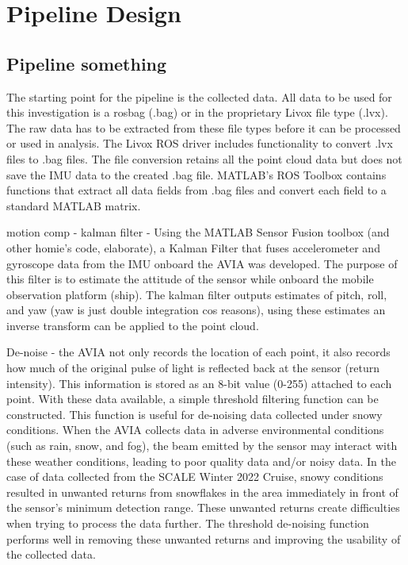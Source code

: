 \chapter{Pipeline Design}
\label{ch:ch5}
\section{Pipeline something}
\label{sec:ch5.section1}

The starting point for the pipeline is the collected data. All data to be used for this investigation is a rosbag (.bag) or in the proprietary Livox file type (.lvx). The raw data has to be extracted from these file types before it can be processed or used in analysis. The Livox ROS driver includes functionality to convert .lvx files to .bag files. The file conversion retains all the point cloud data but does not save the IMU data to the created .bag file. MATLAB's ROS Toolbox contains functions that extract all data fields from .bag files and convert each field to a standard MATLAB matrix.

motion comp - kalman filter - Using the MATLAB Sensor Fusion toolbox (and other homie's code, elaborate), a Kalman Filter that fuses accelerometer and gyroscope data from the IMU onboard the AVIA was developed. The purpose of this filter is to estimate the attitude of the sensor while onboard the mobile observation platform (ship). The kalman filter outputs estimates of pitch, roll, and yaw (yaw is just double integration cos reasons), using these estimates an inverse transform can be applied to the point cloud.

De-noise - the AVIA not only records the location of each point, it also records how much of the original pulse of light is reflected back at the sensor (return intensity). This information is stored as an 8-bit value (0-255) attached to each point. With these data available, a simple threshold filtering function can be constructed. This function is useful for de-noising data collected under snowy conditions. When the AVIA collects data in adverse environmental conditions (such as rain, snow, and fog), the beam emitted by the sensor may interact with these weather conditions, leading to poor quality data and/or noisy data. In the case of data collected from the SCALE Winter 2022 Cruise, snowy conditions resulted in unwanted returns from snowflakes in the area immediately in front of the sensor's minimum detection range. These unwanted returns create difficulties when trying to process the data further. The threshold de-noising function performs well in removing these unwanted returns and improving the usability of the collected data.

